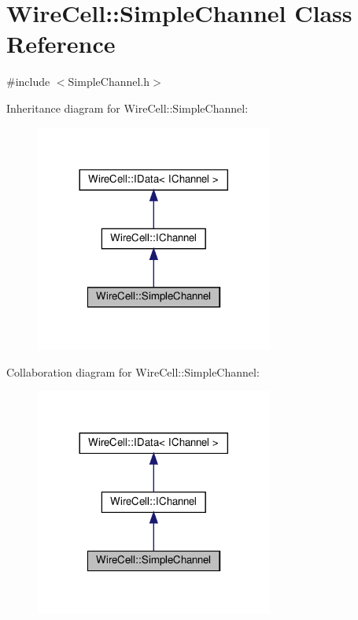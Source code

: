 \hypertarget{class_wire_cell_1_1_simple_channel}{}\section{Wire\+Cell\+:\+:Simple\+Channel Class Reference}
\label{class_wire_cell_1_1_simple_channel}


{\ttfamily \#include $<$Simple\+Channel.\+h$>$}



Inheritance diagram for Wire\+Cell\+:\+:Simple\+Channel\+:
\nopagebreak
\begin{figure}[H]
\begin{center}
\leavevmode
\includegraphics[width=221pt]{class_wire_cell_1_1_simple_channel__inherit__graph}
\end{center}
\end{figure}


Collaboration diagram for Wire\+Cell\+:\+:Simple\+Channel\+:
\nopagebreak
\begin{figure}[H]
\begin{center}
\leavevmode
\includegraphics[width=221pt]{class_wire_cell_1_1_simple_channel__coll__graph}
\end{center}
\end{figure}
